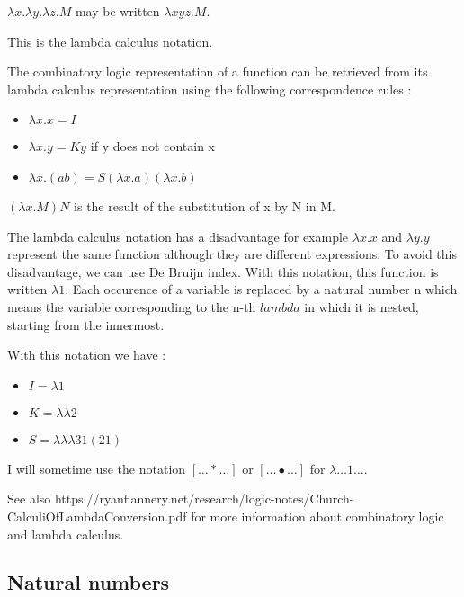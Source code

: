 \documentclass[10pt]{article}
\begin{document}
\( \lambda x . \lambda y . \lambda z . M \) may be written \( \lambda x y z . M \).

This is the lambda calculus notation.

The combinatory logic representation of a function can be retrieved from its lambda calculus representation using the following correspondence rules : 

\begin{itemize}
     \setlength{\itemsep}{1pt}
     \setlength{\parskip}{0pt}
     \setlength{\parsep}{0pt}
\item \( \lambda x . x = I \)
\item \( \lambda x . y = K y \) if y does not contain x
\item \( \lambda x . (a b) = S (\lambda x . a) (\lambda x . b) \)
\end{itemize}

\( (\lambda x . M) N \) is the result of the substitution of x by N in M.

\bigskip

The lambda calculus notation has a disadvantage for example \( \lambda x . x \) and \( \lambda y . y \) represent the same function although they are different expressions. To avoid this disadvantage, we can use De Bruijn index. With this notation, this function is written \( \lambda 1 \). Each occurence of a variable is replaced by a natural number n which means the variable corresponding to the n-th \( lambda \) in which it is nested, starting from the innermost. 

With this notation we have :

\begin{itemize}
     \setlength{\itemsep}{1pt}
     \setlength{\parskip}{0pt}
     \setlength{\parsep}{0pt}
\item \( I = \lambda 1 \)
\item \( K = \lambda \lambda 2 \)
\item \( S = \lambda \lambda \lambda 3 1 (2 1) \)
\end{itemize}

I will sometime use the notation \( [ \ldots * \ldots ] \) or \( [ \ldots \bullet \ldots ] \) for \( \lambda \ldots 1 \ldots \).

\bigskip

See also https://ryanflannery.net/research/logic-notes/Church-CalculiOfLambdaConversion.pdf for more information about combinatory logic and lambda calculus.


\subsection{Natural numbers}
\end{document}
